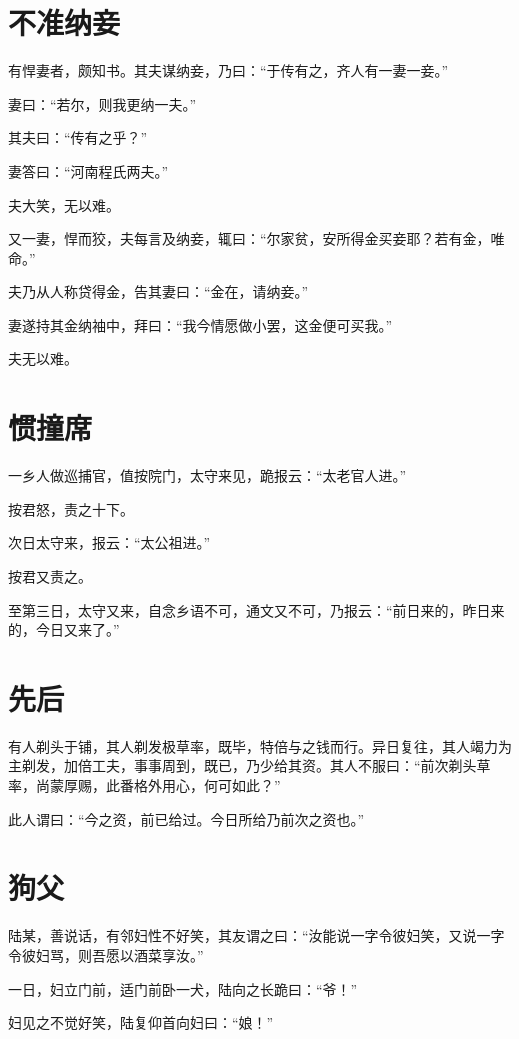 \documentclass[12pt,UTF8]{ctexbook}
\begin{document}
\section{不准纳妾}

有悍妻者，颇知书。其夫谋纳妾，乃曰：“于传有之，齐人有一妻一妾。”

妻曰：“若尔，则我更纳一夫。”

其夫曰：“传有之乎？”

妻答曰：“河南程氏两夫。”

夫大笑，无以难。

又一妻，悍而狡，夫每言及纳妾，辄曰：“尔家贫，安所得金买妾耶？若有金，唯命。”

夫乃从人称贷得金，告其妻曰：“金在，请纳妾。”

妻遂持其金纳袖中，拜曰：“我今情愿做小罢，这金便可买我。”

夫无以难。

\section{惯撞席}

一乡人做巡捕官，值按院门，太守来见，跪报云：“太老官人进。”

按君怒，责之十下。

次日太守来，报云：“太公祖进。”

按君又责之。

至第三日，太守又来，自念乡语不可，通文又不可，乃报云：“前日来的，昨日来的，今日又来了。”

\section{先后}

有人剃头于铺，其人剃发极草率，既毕，特倍与之钱而行。异日复往，其人竭力为主剃发，加倍工夫，事事周到，既已，乃少给其资。其人不服曰：“前次剃头草率，尚蒙厚赐，此番格外用心，何可如此？”

此人谓曰：“今之资，前已给过。今日所给乃前次之资也。”

\section{狗父}

陆某，善说话，有邻妇性不好笑，其友谓之曰：“汝能说一字令彼妇笑，又说一字令彼妇骂，则吾愿以酒菜享汝。”

一日，妇立门前，适门前卧一犬，陆向之长跪曰：“爷！”

妇见之不觉好笑，陆复仰首向妇曰：“娘！”
\end{document}

